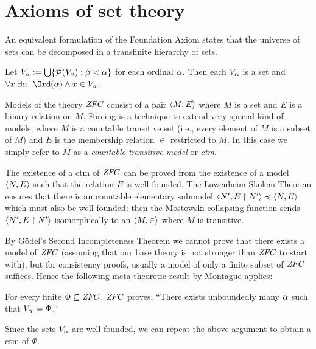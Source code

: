 \section{Axioms of set theory}

\medskip
{}
\medskip

An equivalent formulation of the Foundation Axiom states that the
universe of sets can be decomposed in a transfinite hierarchy of
sets. 
\begin{theorem}
  Let $V_{\alpha}\mathrel{\mathop:}=\mathop{\textstyle\bigcup}\{\mathop{\mathcal{P}}(V_\beta) : \beta<\alpha\}$ for each ordinal
  $\alpha$. Then each $V_\alpha$ is a set and 
  $\forall x. \exists\al .\ \Ord(\al) \y x\in V_\al$.  
\end{theorem}

\medskip
{}
\medskip

Models of the theory $\mathit{ZFC}$ consist of a pair $\langle M,E\rangle$ where $M$
is a set and $E$ is a binary relation on $M$. Forcing is a technique
to extend very special kind of models, where $M$ is a countable
transitive set (i.e., every element of $M$ is a subset of $M$) and
$E$ is the membership relation $\in$ restricted to $M$. In this case
we simply refer to $M$ as a \emph{countable transitive model} or
\emph{ctm}.

The existence of a ctm of $\mathit{ZFC}$ can be proved from the existence of a
model  $\langle N,E\rangle$ such that the relation $E$ is well founded. The
L\"owenheim-Skolem 
Theorem ensures that there is an countable elementary submodel 
$\langle N',E\upharpoonright N'\rangle\preccurlyeq  \langle N,E\rangle$ which must also be
well founded; then the 
Mostowski collapsing function \cite[Def.~I.9.31]{kunen2011set} sends $\langle
N',E\upharpoonright N'\rangle$ 
isomorphically to an $\langle M,\in\rangle$ where $M$ is transitive.

By G\"odel's Second Incompleteness Theorem we cannot  prove that
there exists a model of $\mathit{ZFC}$  (assuming that our base theory is not
stronger than $\mathit{ZFC}$ to start with), but for consistency proofs,
usually a model of only a finite subset of $\mathit{ZFC}$ suffices. Hence the
following meta-theoretic result by Montague applies:
%
\begin{theorem}\label{th:reflection-principle}
  For every finite $\Phi\subseteq\mathit{ZFC}$, $\mathit{ZFC}$ proves: ``There exists
    unboundedly many $\alpha$ such that $V_\alpha\models \Phi$.''
\end{theorem}
%
Since the sets $V_\alpha$ are well founded, we can repeat the above
argument to obtain a ctm of $\Phi$.
%
